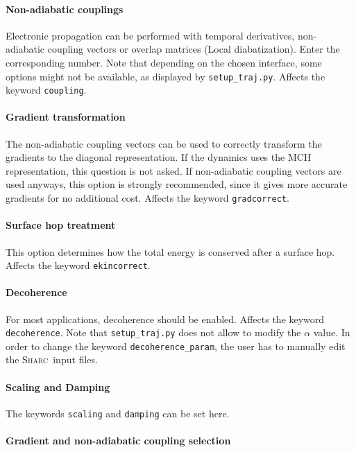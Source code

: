 \documentclass[a4paper,11pt,DIV=15,openany,twoside=false]{scrbook}
\newcommand{\sharc}{\textsc{Sharc}}
\newcommand{\ttt}[1]{\texttt{#1}}
\begin{document}
\paragraph{Non-adiabatic couplings}

Electronic propagation can be performed with temporal derivatives, non-adiabatic coupling vectors or overlap matrices (Local diabatization). Enter the corresponding number. Note that depending on the chosen interface, some options might not be available, as displayed by \ttt{setup\_traj.py}. Affects the keyword \ttt{coupling}.

\paragraph{Gradient transformation}

The non-adiabatic coupling vectors can be used to correctly transform the gradients to the diagonal representation. If the dynamics uses the MCH representation, this question is not asked. If non-adiabatic coupling vectors are used anyways, this option is strongly recommended, since it gives more accurate gradients for no additional cost. Affects the keyword \ttt{gradcorrect}.

\paragraph{Surface hop treatment}

This option determines how the total energy is conserved after a surface hop. Affects the keyword \ttt{ekincorrect}.

\paragraph{Decoherence}

For most applications, decoherence should be enabled. Affects the keyword \ttt{decoherence}. Note that \ttt{setup\_traj.py} does not allow to modify the $\alpha$ value. In order to change the keyword \ttt{decoherence\_param}, the user has to manually edit the \sharc\ input files.

\paragraph{Scaling and Damping}

The keywords \ttt{scaling} and \ttt{damping} can be set here.

\paragraph{Gradient and non-adiabatic coupling selection}
\end{document}
